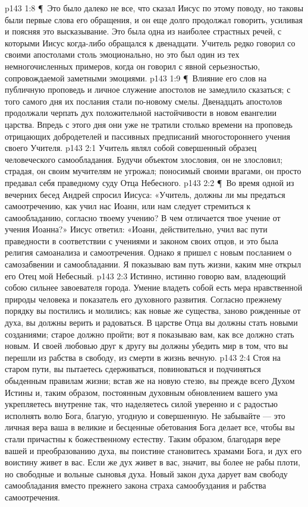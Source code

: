 \vs p143 1:8 \P\ Это было далеко не все, что сказал Иисус по этому поводу, но таковы были первые слова его обращения, и он еще долго продолжал говорить, усиливая и поясняя это высказывание. Это была одна из наиболее страстных речей, с которыми Иисус когда\hyp{}либо обращался к двенадцати. Учитель редко говорил со своими апостолами столь эмоционально, но это был один из тех немногочисленных примеров, когда он говорил с явной серьезностью, сопровождаемой заметными эмоциями.
\vs p143 1:9 \P\ Влияние его слов на публичную проповедь и личное служение апостолов не замедлило сказаться; с того самого дня их послания стали по\hyp{}новому смелы. Двенадцать апостолов продолжали черпать дух положительной настойчивости в новом евангелии царства. Впредь с этого дня они уже не тратили столько времени на проповедь отрицающих добродетелей и пассивных предписаний многостороннего учения своего Учителя.
\vs p143 2:1 Учитель являл собой совершенный образец человеческого самообладания. Будучи объектом злословия, он не злословил; страдая, он своим мучителям не угрожал; поносимый своими врагами, он просто предавал себя праведному суду Отца Небесного.
\vs p143 2:2 \P\ Во время одной из вечерних бесед Андрей спросил Иисуса: «Учитель, должны ли мы предаться самоотречению, как учил нас Иоанн, или нам следует стремиться к самообладанию, согласно твоему учению? В чем отличается твое учение от учения Иоанна?» Иисус ответил: «Иоанн, действительно, учил вас пути праведности в соответствии с учениями и законом своих отцов, и это была религия самоанализа и самоотречения. Однако я пришел с новым посланием о самозабвении и самообладании. Я показываю вам путь жизни, каким мне открыл его Отец мой Небесный.
\vs p143 2:3 Истинно, истинно говорю вам, владеющий собою сильнее завоевателя города. Умение владеть собой есть мера нравственной природы человека и показатель его духовного развития. Согласно прежнему порядку вы постились и молились; как новые же существа, заново рожденные от духа, вы должны верить и радоваться. В царстве Отца вы должны стать новыми созданиями; старое должно пройти; вот я показываю вам, как все должно стать новым. И своей любовью друг к другу вы должны убедить мир в том, что вы перешли из рабства в свободу, из смерти в жизнь вечную.
\vs p143 2:4 Стоя на старом пути, вы пытаетесь сдерживаться, повиноваться и подчиняться обыденным правилам жизни; встав же на новую стезю, вы прежде всего  Духом Истины и, таким образом, постоянным духовным обновлением вашего ума укрепляетесь внутренне так, что наделяетесь силой уверенно и с радостью исполнять волю Бога, благую, угодную и совершенную. Не забывайте --- это личная вера ваша в великие и бесценные обетования Бога делает все, чтобы вы стали причастны к божественному естеству. Таким образом, благодаря вере вашей и преобразованию духа, вы поистине становитесь храмами Бога, и дух его воистину живет в вас. Если же дух живет в вас, значит, вы более не рабы плоти, но свободные и вольные сыновья духа. Новый закон духа дарует вам свободу самообладания вместо прежнего закона страха самообуздания и рабства самоотречения.
